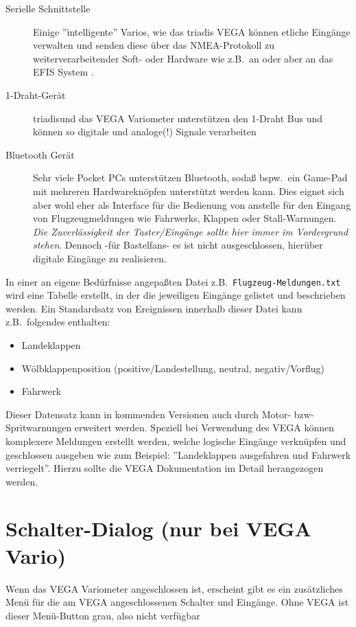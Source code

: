 \begin{description}
     \item[Serielle Schnittstelle]  Einige ''intelligente'' Varios, wie das \textsf{triadis} VEGA  können etliche Eingänge verwalten und senden diese über das NMEA-Protokoll zu weiterverarbeitender Soft- oder Hardware wie z.B.\ an \xc oder aber an das EFIS System \al.
     \item[1-Draht-Gerät]  \textsf{triadis}\al und das VEGA Variometer unterstützen den 1-Draht Bus und können so digitale und analoge(!) Signale verarbeiten
     \item[Bluetooth Gerät]  Sehr viele Pocket \textsf{PC}s unterstützen Bluetooth, sodaß bspw.\ ein Game-Pad mit mehreren  Hardwareknöpfen unterstützt werden kann. 
     Dies eignet sich aber wohl eher als Interface für die Bedienung von \xc anstelle für den Eingang von Flugzeugmeldungen wie Fahrwerks, Klappen oder Stall-Warnungen.
     \textsl{Die Zuverlässigkeit der Taster/Eingänge sollte hier immer im Vordergrund stehen}.
        Dennoch -für Bastelfans- es ist nicht ausgeschlossen, hierüber digitale Eingänge zu realisieren.
\end{description}

In einer an eigene Bedürfnisse angepaßten Datei z.B.\ \texttt{Flugzeug-Meldungen.txt} wird eine Tabelle erstellt, in der die jeweiligen Eingänge gelistet und beschrieben werden. Ein Standardsatz von Ereignissen innerhalb dieser Datei  kann z.B.\ folgendes enthalten:
\begin{itemize}
  \item Landeklappen
  \item Wölbklappenposition (positive/Landestellung, neutral, negativ/Vorflug)
  \item Fahrwerk
\end{itemize}

Dieser Datensatz kann in kommenden Versionen auch durch Motor- bzw- Spritwarnungen erweitert werden.
Speziell bei Verwendung des VEGA können komplexere Meldungen erstellt werden, welche logische Eingänge verknüpfen und geschlossen ausgeben wie zum Beispiel: ''Landeklappen ausgefahren und Fahrwerk verriegelt''. 
Hierzu sollte die VEGA Dokumentation im Detail herangezogen werden.
\section{Schalter-Dialog (\textbf{nur} bei VEGA Vario)}

Wenn das VEGA Variometer angeschlossen ist, erscheint gibt es ein zusätzliches Menü für die am VEGA angeschlossenen Schalter und Eingänge. Ohne VEGA ist dieser Menü-Button grau, also nicht verfügbar 

